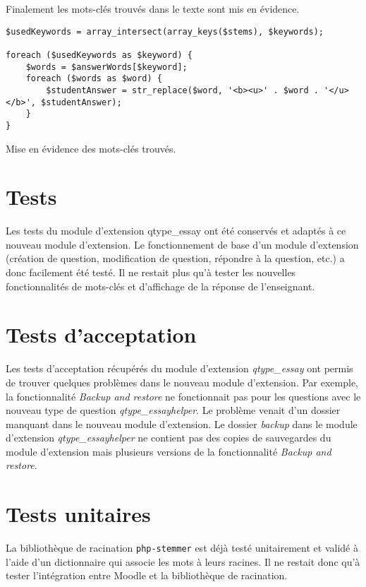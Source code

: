 Finalement les mots-clés trouvés dans le texte sont mis en évidence.

\begin{lstfloat}
\begin{lstlisting}[frame=l]
$usedKeywords = array_intersect(array_keys($stems), $keywords);

foreach ($usedKeywords as $keyword) {
	$words = $answerWords[$keyword];
	foreach ($words as $word) {
		$studentAnswer = str_replace($word, '<b><u>' . $word . '</u></b>', $studentAnswer);
	}
}
\end{lstlisting}
\caption{Mise en évidence des mots-clés trouvés.}
\label{code:mots-cles}
\end{lstfloat}

\section{Tests}

Les tests du module d'extension \og qtype\_essay \fg{} ont été conservés et adaptés à ce nouveau module d'extension.
Le fonctionnement de base d'un module d'extension (création de question, modification de question, répondre à la question, etc.) a donc facilement été testé.
Il ne restait plus qu'à tester les nouvelles fonctionnalités de mots-clés et d'affichage de la réponse de l'enseignant.

\section{Tests d'acceptation}

Les tests d'acceptation récupérés du module d'extension \textit{qtype\_essay} ont permis de trouver quelques problèmes  dans le nouveau module d'extension.
Par exemple, la fonctionnalité \textit{Backup and restore} ne fonctionnait pas pour les questions avec le nouveau type de question \textit{qtype\_essayhelper}.
Le problème venait d'un dossier manquant dans le nouveau module d'extension.
Le dossier \textit{backup} dans le module d'extension \textit{qtype\_essayhelper} ne contient pas des copies de sauvegardes du module d'extension mais plusieurs versions de la fonctionnalité \textit{Backup and restore}.

\section{Tests unitaires}

La biblioth\`eque de racination \texttt{php-stemmer} est déjà testé unitairement et validé à l'aide d'un dictionnaire qui associe les mots à leurs racines.
Il ne restait donc qu'à tester l'int\'egration entre Moodle et la biblioth\`eque de racination.
